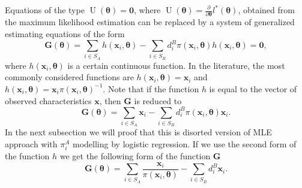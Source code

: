 \documentclass[
]{jss}
\begin{document}
Equations of the type
\(\operatorname{U}(\boldsymbol{\theta}) = \boldsymbol{0}\), where
\(\operatorname{U}(\boldsymbol{\theta}) = \frac{\partial}{\partial \boldsymbol{\theta}} l^*(\boldsymbol{\theta})\),
obtained from the maximum likelihood estimation can be replaced by a
system of generalized estimating equations of the form \begin{equation}
\label{gee}
\mathbf{G}(\boldsymbol{\theta})=\sum_{i \in S_A} h\left(\boldsymbol{x}_i, \boldsymbol{\theta}\right)-\sum_{i \in S_B} d_i^B \pi\left(\boldsymbol{x}_i, \boldsymbol{\theta}\right) h\left(\boldsymbol{x}_i, \boldsymbol{\theta}\right) = \boldsymbol{0},
\end{equation} where
\(h\left(\boldsymbol{x}_i, \boldsymbol{\theta}\right)\) is a certain
continuous function. In the literature, the most commonly considered
functions are
\(h\left(\boldsymbol{x}_i, \boldsymbol{\theta}\right) = \boldsymbol{x}_i\)
and
\(h\left(\boldsymbol{x}_i, \boldsymbol{\theta}\right) = \boldsymbol{x}_i \pi\left(\boldsymbol{x}_i, \boldsymbol{\theta}\right)^{-1}\).
Note that if the function \(h\) is equal to the vector of observed
characteristics \(\boldsymbol{x}\), then \(\mathbf{G}\) is reduced to \[
\mathbf{G}(\boldsymbol{\theta}) = \sum_{i \in S_A} \boldsymbol{x}_i-\sum_{i \in S_B} d_i^B \pi\left(\boldsymbol{x}_i, \boldsymbol{\theta}\right) \boldsymbol{x}_i.
\] In the next subsection we will proof that this is disorted version of
MLE approach with \(\pi_i^A\) modelling by logistic regression. If we
use the second form of the function \(h\) we get the following form of
the function \(\mathbf{G}\) \[
\mathbf{G}(\boldsymbol{\theta}) = \sum_{i \in S_A} \frac{\boldsymbol{x}_i}{\pi\left(\boldsymbol{x}_i, \boldsymbol{\theta}\right) }-\sum_{i \in S_B} d_i^B \boldsymbol{x}_i.
\]
\end{document}
